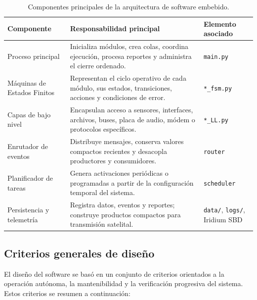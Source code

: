 \vspace{15px}
\begin{table}[htbp]
\centering
\caption{Componentes principales de la arquitectura de software embebido.}
\label{tab:componentes_arquitectura_software}
\small
\begin{tabularx}{\textwidth}{p{} X p{}}
\toprule
\textbf{Componente} & \textbf{Responsabilidad principal} & \textbf{Elemento asociado} \\
\midrule
Proceso principal &
Inicializa módulos, crea colas, coordina ejecución, procesa reportes y administra el cierre ordenado. &
\texttt{main.py} \\
\addlinespace
Máquinas de Estados \newline Finitos &
Representan el ciclo operativo de cada módulo, sus estados, transiciones, acciones y condiciones de error. &
\texttt{*\_fsm.py} \\
\addlinespace
Capas de bajo nivel &
Encapsulan acceso a sensores, interfaces, archivos, buses, placa de audio, módem o protocolos específicos. &
\texttt{*\_LL.py} \\
\addlinespace
Enrutador de eventos &
Distribuye mensajes, conserva valores compactos recientes y desacopla productores y consumidores. &
\texttt{router} \\
\addlinespace
Planificador de tareas &
Genera activaciones periódicas o programadas a partir de la configuración temporal del sistema. &
\texttt{scheduler} \\
\addlinespace
Persistencia y \newline telemetría &
Registra datos, eventos y reportes; construye productos compactos para transmisión satelital. &
\texttt{data/}, \texttt{logs/}, Iridium SBD \\
\bottomrule
\end{tabularx}
\end{table}

\vspace{15px}
\subsection{Criterios generales de diseño}
\label{subsec:criterios_diseno_software}

El diseño del software se basó en un conjunto de criterios orientados a la operación autónoma, la mantenibilidad y la verificación progresiva del sistema. Estos criterios se resumen a continuación:

